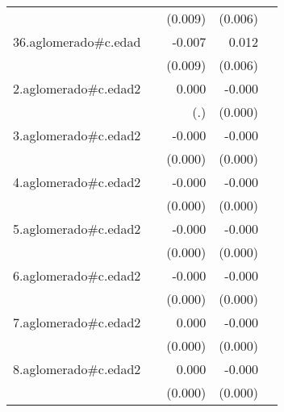 {\begin{longtable}{l*{4}{D{.}{.}{-1}}}
            &                     &     (0.009)         &     (0.006)         &                     \\
\addlinespace
36.aglomerado#c.edad&                     &      -0.007         &       0.012\sym{*}  &                     \\
            &                     &     (0.009)         &     (0.006)         &                     \\
\addlinespace
2.aglomerado#c.edad2&                     &       0.000         &      -0.000\sym{*}  &                     \\
            &                     &         (.)         &     (0.000)         &                     \\
\addlinespace
3.aglomerado#c.edad2&                     &      -0.000         &      -0.000\sym{***}&                     \\
            &                     &     (0.000)         &     (0.000)         &                     \\
\addlinespace
4.aglomerado#c.edad2&                     &      -0.000         &      -0.000\sym{***}&                     \\
            &                     &     (0.000)         &     (0.000)         &                     \\
\addlinespace
5.aglomerado#c.edad2&                     &      -0.000         &      -0.000\sym{***}&                     \\
            &                     &     (0.000)         &     (0.000)         &                     \\
\addlinespace
6.aglomerado#c.edad2&                     &      -0.000\sym{*}  &      -0.000\sym{***}&                     \\
            &                     &     (0.000)         &     (0.000)         &                     \\
\addlinespace
7.aglomerado#c.edad2&                     &       0.000         &      -0.000         &                     \\
            &                     &     (0.000)         &     (0.000)         &                     \\
\addlinespace
8.aglomerado#c.edad2&                     &       0.000         &      -0.000         &                     \\
            &                     &     (0.000)         &     (0.000)         &                     \\

\end{longtable}}
